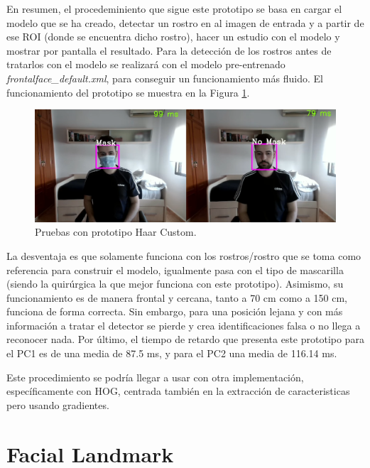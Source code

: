En resumen, el procedeminiento que sigue este prototipo se basa en cargar el modelo que se ha creado, detectar un rostro en al imagen de entrada y a partir de ese ROI (donde se encuentra dicho rostro), hacer un estudio con el modelo y mostrar por pantalla el resultado. Para la detección de los rostros antes de tratarlos con el modelo se realizará con el modelo pre-entrenado \textit{frontalface\_default.xml}, para conseguir un funcionamiento más fluido. El funcionamiento del prototipo se muestra en la Figura \ref{fig:haarCustom}.

\begin{figure}[htp]
	\centering
	\includegraphics[width=15cm]{imagenes/haarcustom_prueba.png}
	\caption{Pruebas con prototipo Haar Custom.}
	\label{fig:haarCustom}
\end{figure}

La desventaja es que solamente funciona con los rostros/rostro que se toma como referencia para construir el modelo, igualmente pasa con el tipo de mascarilla (siendo la quirúrgica la que mejor funciona con este prototipo). Asimismo, su funcionamiento es de manera frontal y cercana, tanto a 70 cm como a 150 cm, funciona de forma correcta. Sin embargo, para una posición lejana y con más información a tratar el detector se pierde y crea identificaciones falsa o no llega a reconocer nada. Por último, el tiempo de retardo que presenta este prototipo para el PC1 es de una media de 87.5 ms, y para el PC2 una media de 116.14 ms.

Este procedimiento se podría llegar a usar con otra implementación, específicamente con HOG, centrada también en la extracción de caracteristicas pero usando gradientes.

\newpage
\section{Facial Landmark}

